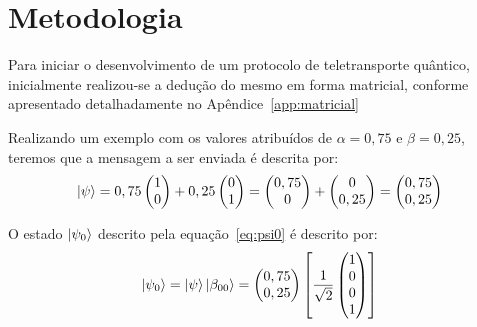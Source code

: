 
\chapter{Metodologia}
Para iniciar o desenvolvimento de um protocolo de teletransporte quântico, inicialmente realizou-se a dedução do mesmo em forma matricial, conforme apresentado detalhadamente no Apêndice~\ref{app:matricial}

Realizando um exemplo com os valores atribuídos de $\alpha=0,75$ e $\beta=0,25$, teremos que a mensagem a ser enviada é descrita por:
\begin{equation}
\ket{\psi} = 0,75 \begin{pmatrix}
1 \\
0
\end{pmatrix} + 0,25 \begin{pmatrix}
0 \\
1
\end{pmatrix} = \begin{pmatrix}
0,75 \\
0
\end{pmatrix} + \begin{pmatrix}
0 \\
0,25
\end{pmatrix} = \begin{pmatrix}
0,75 \\
0,25
\end{pmatrix}
\end{equation} 

O estado $\ket{\psi_0}$ descrito pela equação~\eqref{eq:psi0} é descrito por:
\begin{equation}
\ket{\psi_0}=\ket{\psi}\ket{\beta_{00}}= \begin{pmatrix}
0,75 \\
0,25  
\end{pmatrix} \left[\frac{1}{\sqrt{2}} \begin{pmatrix}
1 \\
0 \\
0 \\
1
\end{pmatrix}\right]
\end{equation}

